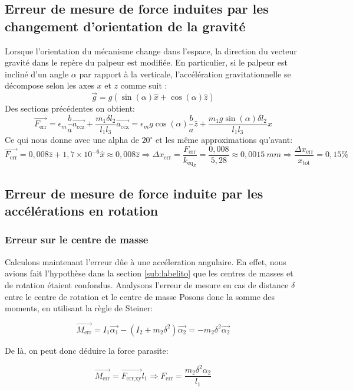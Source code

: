 \documentclass[a4paper, 11pt]{article} %
\begin{document}
\subsection{Erreur de mesure de force induites par les changement d’orientation de la gravité}

Lorsque l'orientation du mécanisme change dans l’espace, la direction du vecteur gravité dans le repère du palpeur est modifiée. En particulier, si le palpeur est incliné d’un angle $\alpha$ par rapport à la verticale, l’accélération gravitationnelle se décompose selon les axes $x$ et $z$ comme suit :
\[
\vec{g} = g \left( \sin(\alpha)\hat{x} + \cos(\alpha)\hat{z} \right)
\]
Des sections précédentes on obtient:
$$\vec{F_\text{err}} = \epsilon_m\frac{b}{a}\vec{a_\text{ccz}} + \frac{m_1 \delta l_2}{l_1l_3}\vec{a_\text{ccx}} = \epsilon_mg\cos(\alpha)\frac{b}{a}\hat{z} + \frac{m_1g\sin(\alpha) \delta l_2}{l_1l_3}\hat{x}$$
Ce qui nous donne avec une alpha de $20^\circ$ et les même approximations qu'avant:
$$\vec{F_\text{err}} = 0,008\hat{z} + 1,7\times10^{-6}\hat{x} \approx 0,008\hat{z} \Rightarrow\Delta x_\text{err} = \frac{{F_\text{err}}}{k_{\text{eq}_Z}} = \frac{0,008}{5,28} \approx 0,0015 \ mm \Rightarrow \frac{\Delta x_\text{err}}{x_\text{tot}} = 0,15\%$$

  


\subsection{Erreur de mesure de force induite par les accélérations en rotation}\label{sub:bonecaambalabu}
\subsubsection*{Erreur sur le centre de masse}
Calculons maintenant l'erreur dûe à une accéleration angulaire. En effet, nous avions fait l'hypothèse dans la section \ref{sub:labelito} que les centres de masses et de rotation étaient confondus. Analysons l'erreur de mesure en cas de distance $\delta$ entre le centre de rotation et le centre de masse Posons donc la somme des moments, en utilisant la règle de Steiner:

$$\vec{M_\text{err}} = I_1\vec{\alpha_\text{1}} - (I_2 +
 m_2\delta^2)\vec{\alpha_\text{2}} = -
 m_2\delta^2\vec{\alpha_\text{2}}$$

 De là, on peut donc déduire la force parasite:

 $$\vec{M_\text{err}} =\vec{F_\text{err,xy}}l_\text{1} \Rightarrow F_\text{err} = \frac{
 m_2\delta^2{\alpha_\text{2}}}{l_\text{1}} $$
\end{document}
